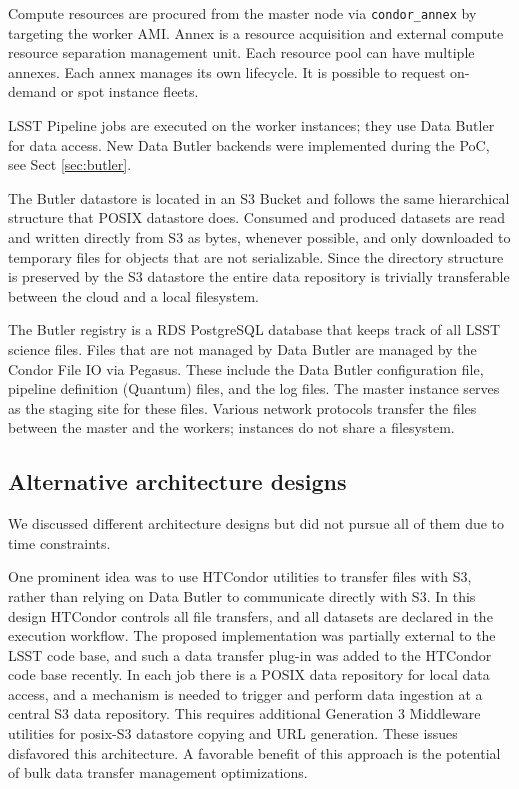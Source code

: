 Compute resources are procured from the master node via \texttt{condor\_annex} by targeting the worker AMI. Annex is a resource acquisition and external compute resource separation management unit. Each resource pool can have multiple annexes. Each annex manages its own lifecycle. It is possible to request on-demand or spot instance fleets.

LSST Pipeline jobs are executed on the worker instances; they use Data Butler for data access.
New Data Butler backends were implemented during the PoC, see Sect \ref{sec:butler}.

The Butler datastore is located in an S3 Bucket and follows the same hierarchical structure that POSIX datastore does. Consumed and produced datasets are read and written directly from S3 as bytes, whenever possible, and only downloaded to temporary files for objects that are not serializable.
Since the directory structure is preserved by the S3 datastore the entire data repository is trivially transferable between the cloud and a local filesystem.

The Butler registry is a RDS PostgreSQL database that keeps track of all LSST science files.
Files that are not managed by Data Butler are managed by the Condor File IO via Pegasus. These include the Data Butler configuration file, pipeline definition (Quantum) files, and the log files. The master instance serves as the staging site for these files. Various network protocols transfer the files between the master and the workers; instances do not share a filesystem.

\subsection{Alternative architecture designs}

We discussed different architecture designs but did not pursue all of them due to time constraints.

One prominent idea was to use HTCondor utilities to transfer files with S3, rather than relying on Data Butler to communicate directly with S3. In this design HTCondor controls all file transfers, and all datasets are declared in the execution workflow. The proposed implementation was partially external to the LSST code base, and such a data transfer plug-in was added to the HTCondor code base recently. In each job there is a POSIX data repository for local data access, and a mechanism is needed to trigger and perform data ingestion at a central S3 data repository. This requires additional Generation 3 Middleware utilities for posix-S3 datastore copying and URL generation. These issues disfavored this architecture. A favorable benefit of this approach is the potential of bulk data transfer management optimizations.


